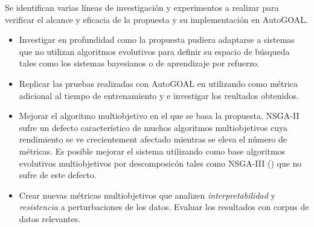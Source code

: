 \begin{recomendations}
Se identifican varias l\'ineas de investigaci\'on y experimentos a realizar para verificar el alcance y eficacia de la propuesta y su implementaci\'on en AutoGOAL.
\begin{itemize}
    \item Investigar en profundidad  como la propuesta pudiera adaptarse a sistemas que no utilizan algoritmos evolutivos para definir su espacio de b\'usqueda tales como los sistemas bayesianos o de aprendizaje por refuerzo.

    \item Replicar las pruebas realizadas con AutoGOAL en \cite{estevez2020solving} utilizando como m\'etrica adicional al tiempo de entrenamiento y e investigar los reultados obtenidos. 
    \item Mejorar el algoritmo multiobjetivo en el que se basa la propuesta. NSGA-II sufre un defecto caracter\'istico de muchos algoritmos multiobjetivos cuya rendimiento se ve crecientement afectado mientras se eleva el n\'umero de m\'etricas. Es posible mejorar el sistema utilizando como base algoritmos evolutivos multiobjetivos por descomposic\'on tales como NSGA-III (\cite{deb2013evolutionary}) que no sufre de este defecto.
    
    \item Crear nuevas m\'etricas multiobjetivos que analizen \textit{interpretabilidad} y \textit{resistencia} a perturbaciones de los datos. Evaluar los resultados con corpus de datos relevantes.
\end{itemize}

\end{recomendations}
